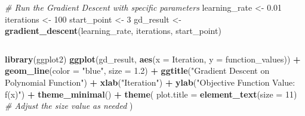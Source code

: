 \documentclass[
  12 pt,
  a4paper,
]{book}
\newenvironment{Shaded}{\begin{snugshade}}{\end{snugshade}}
\newcommand{\AttributeTok}[1]{\textcolor[rgb]{0.13,0.29,0.53}{#1}}
\newcommand{\CommentTok}[1]{\textcolor[rgb]{0.56,0.35,0.01}{\textit{#1}}}
\newcommand{\DecValTok}[1]{\textcolor[rgb]{0.00,0.00,0.81}{#1}}
\newcommand{\FloatTok}[1]{\textcolor[rgb]{0.00,0.00,0.81}{#1}}
\newcommand{\FunctionTok}[1]{\textcolor[rgb]{0.13,0.29,0.53}{\textbf{#1}}}
\newcommand{\NormalTok}[1]{#1}
\newcommand{\OtherTok}[1]{\textcolor[rgb]{0.56,0.35,0.01}{#1}}
\newcommand{\SpecialCharTok}[1]{\textcolor[rgb]{0.81,0.36,0.00}{\textbf{#1}}}
\newcommand{\StringTok}[1]{\textcolor[rgb]{0.31,0.60,0.02}{#1}}
\numberwithin{equation}{section}
\theoremstyle{plain}      %
\theoremstyle{definition} %
\theoremstyle{remark}     %
\theoremstyle{note}         %
\begin{document}
\begin{Shaded}
\begin{Highlighting}[]
\CommentTok{\# Run the Gradient Descent with specific parameters}
\NormalTok{learning\_rate }\OtherTok{\textless{}{-}} \FloatTok{0.01}
\NormalTok{iterations }\OtherTok{\textless{}{-}} \DecValTok{100}
\NormalTok{start\_point }\OtherTok{\textless{}{-}} \DecValTok{3}
\NormalTok{gd\_result }\OtherTok{\textless{}{-}} \FunctionTok{gradient\_descent}\NormalTok{(learning\_rate, iterations, start\_point)}
\end{Highlighting}
\end{Shaded}

\normalsize

\begin{lstlisting}[caption={\raggedright Gradient Descent: Objective Function vs. Iteration}, label={lst:GradDec2}]
\end{lstlisting}
\scriptsize

\begin{Shaded}
\begin{Highlighting}[]
\FunctionTok{library}\NormalTok{(ggplot2)}
\FunctionTok{ggplot}\NormalTok{(gd\_result, }\FunctionTok{aes}\NormalTok{(}\AttributeTok{x =}\NormalTok{ Iteration, }\AttributeTok{y =}\NormalTok{ function\_values)) }\SpecialCharTok{+}
  \FunctionTok{geom\_line}\NormalTok{(}\AttributeTok{color =} \StringTok{"blue"}\NormalTok{, }\AttributeTok{size =} \FloatTok{1.2}\NormalTok{) }\SpecialCharTok{+}
  \FunctionTok{ggtitle}\NormalTok{(}\StringTok{"Gradient Descent on Polynomial Function"}\NormalTok{) }\SpecialCharTok{+}
  \FunctionTok{xlab}\NormalTok{(}\StringTok{"Iteration"}\NormalTok{) }\SpecialCharTok{+}
  \FunctionTok{ylab}\NormalTok{(}\StringTok{"Objective Function Value: f(x)"}\NormalTok{) }\SpecialCharTok{+}
  \FunctionTok{theme\_minimal}\NormalTok{() }\SpecialCharTok{+}
  \FunctionTok{theme}\NormalTok{(}
    \AttributeTok{plot.title =} \FunctionTok{element\_text}\NormalTok{(}\AttributeTok{size =} \DecValTok{11}\NormalTok{)  }\CommentTok{\# Adjust the size value as needed}
\NormalTok{  )}
\end{Highlighting}
\end{Shaded}
\end{document}
